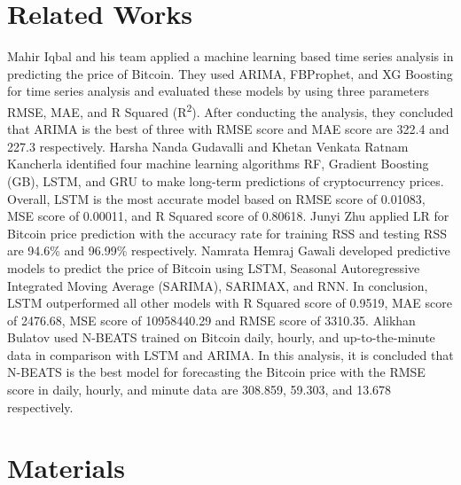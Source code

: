 \documentclass{ieeeojies}
\begin{document}
\section{Related Works}
Mahir Iqbal and his team \cite{b1} applied a machine learning based time series analysis in predicting the price of Bitcoin. They used ARIMA, FBProphet, and XG Boosting for time series analysis and evaluated these models by using three parameters RMSE, MAE, and R Squared (R\textsuperscript{2}). After conducting the analysis, they concluded that ARIMA is the best of three with RMSE score and MAE score are 322.4 and 227.3 respectively.\newline
Harsha Nanda Gudavalli and Khetan Venkata Ratnam Kancherla \cite{b2} identified four machine learning algorithms RF, Gradient Boosting (GB), LSTM, and GRU to make long-term predictions of cryptocurrency prices. Overall, LSTM is the most accurate model based on RMSE score of 0.01083, MSE score of 0.00011, and R Squared score of 0.80618.\newline
Junyi Zhu \cite{b3} applied LR for Bitcoin price prediction with the accuracy rate for training RSS and testing RSS are 94.6\% and 96.99\% respectively.\newline
Namrata Hemraj Gawali \cite{b4} developed predictive models to predict the price of Bitcoin using LSTM, Seasonal Autoregressive Integrated Moving Average (SARIMA), SARIMAX, and RNN. In conclusion, LSTM outperformed all other models with R Squared score of 0.9519, MAE score of 2476.68, MSE score of 10958440.29 and RMSE score of 3310.35.\newline
Alikhan Bulatov \cite{b5} used N-BEATS trained on Bitcoin daily, hourly, and up-to-the-minute data in comparison with LSTM and ARIMA. In this analysis, it is concluded that N-BEATS is the best model for forecasting the Bitcoin price with the RMSE score in daily, hourly, and minute data are 308.859, 59.303, and 13.678 respectively.
\section{Materials}
\end{document}
